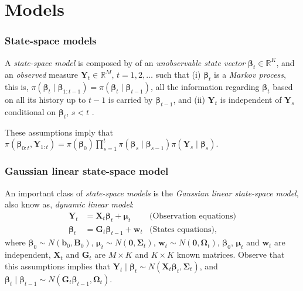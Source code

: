 \documentclass[12pt, compress]{beamer}
\begin{document}
\section{Models}
\begin{frame}
	\frametitle{State-space models}
A \textit{state-space model} is composed by of an \textit{unobservable state vector}  $\bm{\beta}_t \in \mathbb{R}^K$, and an \textit{observed} measure $\bm{Y}_t \in \mathbb{R}^M$, $t=1,2,\dots$ such that (i) $\bm{\beta}_t$ is a \textit{Markov process}, this is, $\pi(\bm{\beta}_t\mid \bm{\beta}_{1:t-1})=\pi(\bm{\beta}_t\mid \bm{\beta}_{t-1})$, all the information regarding $\bm{\beta}_t$ based on all its history up to $t-1$ is carried by $\bm{\beta}_{t-1}$, and (ii) $\bm{Y}_t$ is independent of $\bm{Y}_s$ conditional on $\bm{\beta}_t$, $s < t$ \cite[Chap.~2]{petris2009dynamic}.

These assumptions imply that $\pi(\bm{\beta}_{0:t},\bm{Y}_{1:t})=\pi(\bm{\beta}_0)\prod_{s=1}^{t}\pi(\bm{\beta}_s\mid \bm{\beta}_{s-1})\pi(\bm{Y}_s\mid \bm{\beta}_s)$.
\end{frame}

\begin{frame}
	\frametitle{Gaussian linear state-space model}
An important class of \textit{state-space models} is the \textit{Gaussian linear state-space model}, also know as, \textit{dynamic linear model}:
\begin{align*}
	\bm{Y}_t&=\bm{X}_t\bm{\beta}_t+\bm{\mu}_t& \text{(Observation equations)}\\
	\bm{\beta}_t&=\bm{G}_t\bm{\beta}_{t-1}+\bm{w}_t & \text{(States equations)},
\end{align*}
where $\bm{\beta}_0\sim N(\bm{b}_0,\bm{B}_0)$, $\bm{\mu}_t\sim N(\bm{0}, \bm{\Sigma}_t)$, $\bm{w}_t\sim N(\bm{0}, \bm{\Omega}_t)$, $\bm{\beta}_0$, $\bm{\mu}_t$ and $\bm{w}_t$ are independent, $\bm{X}_t$ and $\bm{G}_t$ are $M\times K$ and $K\times K$ known matrices. Observe that this assumptions implies that $\bm{Y}_t\mid \bm{\beta}_t\sim N(\bm{X}_t\bm{\beta}_t,\bm{\Sigma}_t)$, and $\bm{\beta}_t\mid \bm{\beta}_{t-1}\sim N(\bm{G}_t\bm{\beta}_{t-1},\bm{\Omega}_t)$.
\end{frame}
\end{document}

